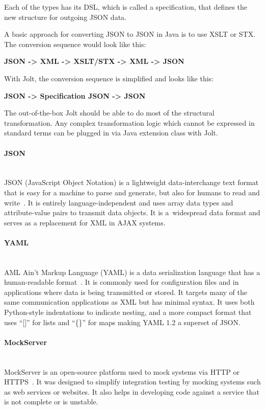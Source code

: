 Each of the types has its DSL, which is called a specification, that defines the new structure for outgoing JSON data.

A basic approach for converting JSON to JSON in Java is to use XSLT or STX. The conversion sequence would look like this:
\begin{center}
\textbf{JSON -> XML -> XSLT/STX -> XML -> JSON}
\end{center}

With Jolt, the conversion sequence is simplified and looks like this:
\begin{center}
\textbf{JSON -> Specification JSON -> JSON}
\end{center}

The out-of-the-box Jolt should be able to do most of the structural transformation. Any complex transformation logic which cannot be expressed in standard terms can be plugged in via Java extension class with Jolt.

\paragraph{\large{JSON}}\mbox{}\\[2pt]
JSON (JavaScript Object Notation) is a lightweight data-interchange text format that is easy for a machine to parse and generate, but also for humans to read and write~\cite{json}. It is entirely language-independent and uses array data types and attribute-value pairs to transmit data objects. It is a~widespread data format and serves as a replacement for XML in AJAX systems.

\paragraph{\large{YAML}}\mbox{}\\[2pt]
AML Ain't Markup Language (YAML) is a data serialization language that has a human-readable format~\cite{yaml}. It is commonly used for configuration files and in applications where data is being transmitted or stored. It targets many of the same communication applications as XML but has minimal syntax. It uses both Python-style indentations to indicate nesting, and a more compact format that uses ``[]'' for lists and ``\{\}'' for maps making YAML 1.2 a superset of JSON.

\paragraph{\large{MockServer}}\mbox{}\\[2pt]
MockServer is an open-source platform used to mock systems via HTTP or HTTPS~\cite{mockserver}. It was designed to simplify integration testing by mocking systems such as web services or websites. It also helps in developing code against a service that is not complete or is unstable.

